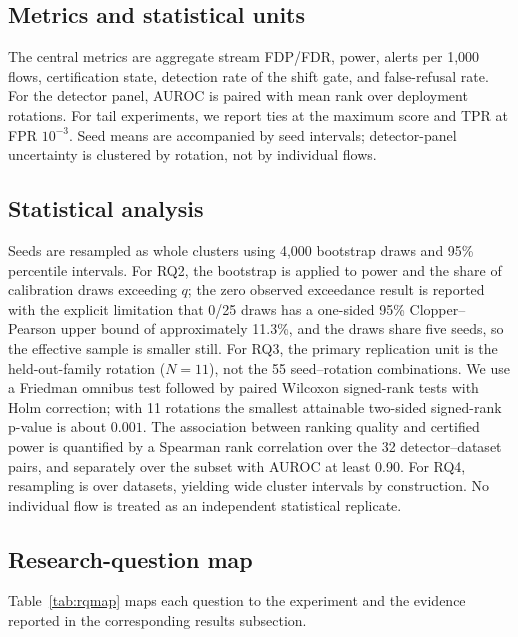 \documentclass[a4paper,fleqn]{cas-dc}
\begin{document}
\subsection{Metrics and statistical units}
The central metrics are aggregate stream FDP/FDR, power, alerts per 1,000 flows, certification state, detection rate of the shift gate, and false-refusal rate. For the detector panel, AUROC is paired with mean rank over deployment rotations. For tail experiments, we report ties at the maximum score and TPR at FPR $10^{-3}$. Seed means are accompanied by seed intervals; detector-panel uncertainty is clustered by rotation, not by individual flows.

\subsection{Statistical analysis}
Seeds are resampled as whole clusters using 4,000 bootstrap draws and 95\% percentile intervals. For RQ2, the bootstrap is applied to power and the share of calibration draws exceeding $q$; the zero observed exceedance result is reported with the explicit limitation that 0/25 draws has a one-sided 95\% Clopper--Pearson upper bound of approximately 11.3\%, and the draws share five seeds, so the effective sample is smaller still. For RQ3, the primary replication unit is the held-out-family rotation ($N=11$), not the 55 seed--rotation combinations. We use a Friedman omnibus test followed by paired Wilcoxon signed-rank tests with Holm correction; with 11 rotations the smallest attainable two-sided signed-rank p-value is about $0.001$. The association between ranking quality and certified power is quantified by a Spearman rank correlation over the 32 detector--dataset pairs, and separately over the subset with AUROC at least 0.90. For RQ4, resampling is over datasets, yielding wide cluster intervals by construction. No individual flow is treated as an independent statistical replicate.

\subsection{Research-question map}
Table~\ref{tab:rqmap} maps each question to the experiment and the evidence reported in the corresponding results subsection.
\end{document}
